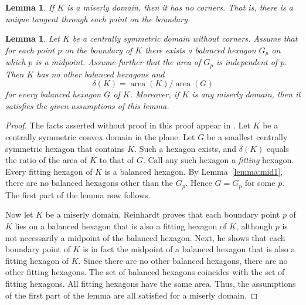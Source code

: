 \documentclass[11pt]{amsart}
\newtheorem{lemma}[equation]{Lemma}
\def\op#1{{\operatorname{#1}}}
\def\deltalat{\mathbb\delta}  %
\def\aa{{\op{area}}}
\begin{document}
\begin{lemma}\label{lemma:221} 
  If $K$ is a miserly domain, then it has no corners.  That is, there
  is a unique tangent through each point on the boundary.
  \cite[p.221]{Reinhardt:1934}
\end{lemma}

\begin{lemma}\label{lemma:mid-min} 
Let $K$ be a centrally symmetric domain without corners.  Assume
  that for each point $p$ on the boundary of $K$ there exists a
  balanced hexagon $G_p$ on which $p$ is a midpoint.  Assume further
  that the area of $G_p$ is independent of $p$.  Then $K$ has no
  other balanced hexagons and
\begin{equation}\label{eqn:density}
\deltalat(K) = \aa(K)/\aa(G)
\end{equation}
for every balanced hexagon $G$ of $K$.
Moreover, if $K$ is any miserly domain, then it satisfies the given assumptions
  of this lemma.
\end{lemma}
%
\begin{proof} The facts asserted without proof in this proof appear in
  \cite[pp.219--222]{Reinhardt:1934}.  Let $K$ be a centrally symmetric convex
  domain in the plane.  Let $G$ be a smallest centrally symmetric
  hexagon that contains $K$.  Such a hexagon exists, and
  $\deltalat(K)$ equals the ratio of the area of $K$ to that of
  $G$. %
  Call any such hexagon a {\it fitting} hexagon.  Every fitting
  hexagon of $K$ is a balanced hexagon. %
  By Lemma~\ref{lemma:mid1}, there are no balanced hexagons other than
  the $G_p$.  Hence $G=G_p$ for some $p$.  The first part of the lemma
  now follows.

  Now let $K$ be a miserly domain.  Reinhardt proves that each
  boundary point $p$ of $K$ lies on a balanced hexagon that is also a
  fitting hexagon of $K$, although $p$ is not necessarily a midpoint
  of the balanced hexagon.  %
  Next, he shows that each boundary point of $K$ is in fact the
  midpoint of a balanced hexagon that is also a fitting hexagon of
  $K$. %
  Since there are no other balanced hexagons, there are no other
  fitting hexagons.  The set of balanced hexagons coincides with the
  set of fitting hexagons.  All fitting hexagons have the same area.
  Thus, the assumptions of the first part of the lemma are all
  satisfied for a miserly domain.
\end{proof}
\end{document}
